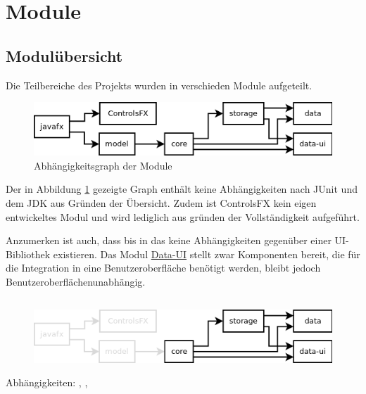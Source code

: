 
\newcommand{\depBox}[1]{
	\begin{adjustbox}{minipage=0.90\textwidth,margin=0 \smallskipamount,center}
		Abhängigkeiten:	 #1
	\end{adjustbox} ~\\
}

\section{Module}
\subsection{Modulübersicht}
Die Teilbereiche des Projekts wurden in verschieden Module aufgeteilt.

\begin{figure}[h!]
	\centering
	\includegraphics[width=.8\textwidth]{module_dependencies.png}
	\caption{Abhängigkeitsgraph der Module}
	\label{mod_dep_view}
\end{figure}

Der in Abbildung \ref{mod_dep_view} gezeigte Graph enthält keine Abhängigkeiten nach JUnit und
dem JDK aus Gründen der Übersicht. Zudem ist ControlsFX kein eigen entwickeltes Modul 
und wird lediglich aus gründen der Vollständigkeit aufgeführt.

Anzumerken ist auch, dass bis in das  keine Abhängigkeiten
gegenüber einer UI-Bibliothek existieren. Das Modul \hyperref[mod_data-ui]{Data-UI} stellt
zwar Komponenten bereit, die für die Integration in eine Benutzeroberfläche benötigt werden,
bleibt jedoch Benutzeroberflächenunabhängig.


\subsection{\textModCore}
\label{\textModCore}
\begin{figure}[h!]
	\centering
	\includegraphics[width=.8\textwidth]{module_dependencies_core.png}
\end{figure}
\depBox{, , \refLongP{\textModStorage}}

